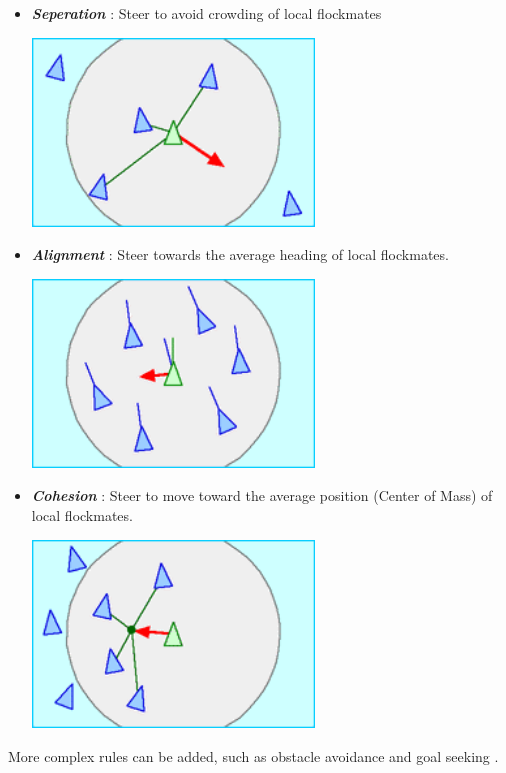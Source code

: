 \documentclass[12pt]{report}
\begin{document}
\begin{itemize}
  \item
  \textbf{\textit{Seperation}} : Steer to avoid crowding of local flockmates
    \begin{center}
      \includegraphics[height=5cm]{Rule_separation.png}
    \end{center}
  \item
  \textbf{\textit{Alignment}} : Steer towards the average heading of local flockmates.
  \begin{center}
    \includegraphics[height=5cm]{Rule_alignment.png}
  \end{center}
  \item
  \textbf{\textit{Cohesion}} : Steer to move toward the average position (Center of Mass) of local flockmates.
    \begin{center}
    \includegraphics[height=5cm]{Rule_cohesion.png}
  \end{center}
\end{itemize}

\vspace{0.5cm}
More complex rules can be added, such as obstacle avoidance and goal seeking .\\
\end{document}
